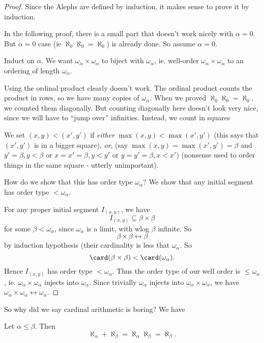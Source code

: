 \documentclass[a4paper]{article}
\begin{document}
\begin{proof}
  Since the Alephs are defined by induction, it makes sense to prove it by induction.

  In the following proof, there is a small part that doesn't work nicely with $\alpha = 0$. But $\alpha = 0$ case (ie $\aleph_0\aleph_0 = \aleph_0$) is already done. So assume $\alpha = 0$.

  Induct on $\alpha$. We want $\omega_\alpha \times \omega_\alpha$ to biject with $\omega_\alpha$, ie. well-order $\omega_\alpha \times \omega_\alpha$ to an ordering of length $\omega_\alpha$.

  Using the ordinal product clearly doesn't work. The ordinal product counts the product in rows, so we have many copies of $\omega_\alpha$. When we proved $\aleph_0\aleph_0 = \aleph_0$, we counted them diagonally. But counting diagonally here doesn't look very nice, since we will have to ``jump over'' infinities. Instead, we count in squares
  \begin{center}
  \end{center}
  We set $(x, y) < (x', y')$ if \emph{either} $\max(x, y) < \max(x', y')$ (this says  that $(x', y')$ is in a bigger square), \emph{or}, (say $\max(x, y) = \max(x', y') = \beta$ and $y' = \beta, y < \beta$ or $x = x' = \beta, y < y'$ or $y = y' = \beta, x < x'$) (nonsense used to order things in the same square - utterly unimportant).

  How do we show that this has order type $\omega_\alpha$? We show that any initial segment has order type $ < \omega_\alpha$.

  For any proper initial segment $I_{(x, y)}$, we have
  \[
    I_{(x, y)} \subseteq \beta\times \beta
  \]
  for some $\beta < \omega_\alpha$, since $\omega_\alpha$ is a limit, with wlog $\beta$ infinite. So
  \[
    \beta\times \beta \leftrightarrow \beta
  \]
  by induction hypothesis (their cardinality is less that $\omega_\alpha$. So
  \[
    \card(\beta\times \beta) < \card(\omega_\alpha).
  \]
  Hence $I_{(x, y)}$ has order type $ < \omega_\alpha$. Thus the order type of our well order is $\leq \omega_\alpha$, ie. $\omega_\alpha \times \omega_\alpha$ injects into $\omega_\alpha$. Since trivially $\omega_\alpha$ injects into $\omega_\alpha \times \omega_\alpha$, we have$\omega_\alpha \times \omega_\alpha \leftrightarrow \omega_\alpha$.
\end{proof}
So why did we say cardinal arithmetic is boring? We have
\begin{cor}
  Let $\alpha \leq \beta$. Then
  \[
    \aleph_\alpha + \aleph_\beta = \aleph_\alpha\aleph_\beta = \aleph_\beta.
  \]
\end{cor}
\end{document}
